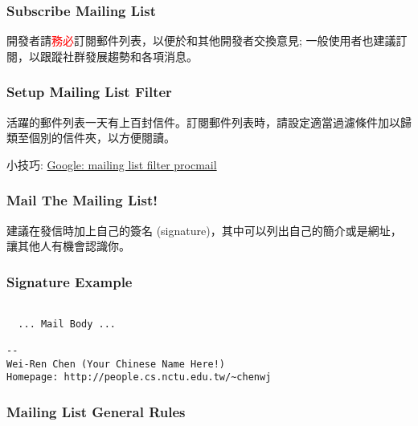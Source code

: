 \documentclass[CJK]{beamer}
\begin{document}
\begin{CJK}{UTF8}{bkai}
\begin{frame}
\end{frame}

\begin{frame}
  \frametitle{Subscribe Mailing List}

開發者請\textcolor{red}{務必}訂閱郵件列表，以便於和其他開發者交換意見; 一般使用者也建議訂閱，以跟蹤社群發展趨勢和各項消息。
\end{frame}

\begin{frame}
  \frametitle{Setup Mailing List Filter}

活躍的郵件列表一天有上百封信件。訂閱郵件列表時，請設定適當過濾條件加以歸類至個別的信件夾，以方便閱讀。

\medskip
小技巧:
\href{https://www.google.com/search?q=mailing+list+filter+procmail}{Google: mailing list filter procmail}

\end{frame}

\begin{frame}
  \frametitle{Mail The Mailing List!}

建議在發信時加上自己的簽名 (signature)，其中可以列出自己的簡介或是網址，讓其他人有機會認識你。

\end{frame}

\begin{frame}[fragile]
  \frametitle{Signature Example}

\begin{verbatim}

  ... Mail Body ...

--
Wei-Ren Chen (Your Chinese Name Here!)
Homepage: http://people.cs.nctu.edu.tw/~chenwj
\end{verbatim}

\end{frame}


\begin{frame}
  \frametitle{Mailing List General Rules}


\end{frame}
\end{CJK}
\end{document}
